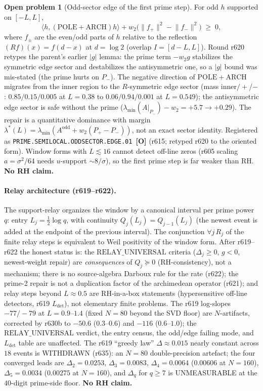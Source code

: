 \documentclass[11pt]{article}
\newcommand{\mO}{\textcolor{openred}{\textbf{[O]}}}
\theoremstyle{definition}
\newtheorem{openproblem}[theorem]{Open problem}
\theoremstyle{remark}
\begin{document}
\begin{openproblem}[Odd-sector edge of the first prime step]
For odd $h$ supported on $[-L,L]$,
\[
  \langle h,(\mathrm{POLE}+\mathrm{ARCH})h\rangle
  + w_2\bigl(\lVert f_+\rVert^2-\lVert f_-\rVert^2\bigr)
  \;\ge\; 0,
\]
where $f_\pm$ are the even/odd parts of $h$ relative to the
reflection $(Rf)(x)=f(d-x)$ at $d=\log 2$ (overlap
$I=[d-L,L]$).  Round r620 retypes the parent's earlier
$\lvert g\rvert$ lemma: the prime term $-w_2 g$ stabilizes the
symmetric edge sector and destabilizes the antisymmetric one,
so a $\lvert g\rvert$ bound was mis-stated (the prime hurts on
$P_-$).  The negative direction of $\mathrm{POLE}+\mathrm{ARCH}$
migrates from the inner region to the $R$-symmetric edge
sector (mass inner$/+$/$-$: $0.85/0.15/0.005$ at $L=0.38$ to
$0.06/0.94/0.001$ at $L=0.549$); the antisymmetric edge
sector is safe without the prime
($\lambda_{\min}(A|_{P_-})-w_2=+5.7\to +0.29$).
The repair is a quantitative dominance with margin
$\lambda^*(L)=\lambda_{\min}(A^{\mathrm{odd}}+w_2(P_+-P_-))$,
not an exact sector identity.
Registered as \texttt{PRIME.SEMILOCAL.ODDSECTOR.EDGE.01}~\mO
(r615; retyped r620 to the oriented form).
Window forms with $L\lesssim 16$ cannot detect off-line zeros
(r605 scaling $a=\sigma^2/64$ needs $u$-support $\sim 8/\sigma$),
so the first prime step is far weaker than RH.
\textbf{No RH claim.}
\end{openproblem}

\paragraph{Relay architecture (r619--r622).}
The support-relay organizes the window by a canonical interval
per prime power $q$: entry $L_j=\tfrac12\log q$, with continuity
$Q_j(L_j)=Q_{j-1}(L_j)$ (the newest event is added at the
endpoint of the previous interval).  The conjunction
$\forall j\,R_j$ of the finite relay steps is equivalent to
Weil positivity of the window form.  After r619--r622 the
honest status is: the $\mathrm{RELAY\_UNIVERSAL}$ criteria
($\Delta_j\ge 0$, $g<0$, newest-weight repair) are
\emph{consequences} of $Q_j\succeq 0$ (RH-consistency), not a
mechanism; there is no source-algebra Darboux rule for the
rate (r622); the prime-2 repair is not a duplication factor of
the archimedean operator (r621); and relay steps beyond
$L\approx 0.5$ are RH-in-a-box statements (hypersensitive
off-line detectors, r619 $L_{\mathrm{det}}$), not elementary
finite problems.  The r619 log-slopes $-77/-79$ at
$L=0.9$--$1.4$ (fixed $N=80$ beyond the SVD floor) are
$N$-artifacts, corrected by r630b to $-50.6$ ($0.3$--$0.6$)
and $-116$ ($0.6$--$1.0$); the $\mathrm{RELAY\_UNIVERSAL}$
verdict, the entry census, the odd/edge failing mode, and
$L_{\mathrm{det}}$ table are unaffected.  The r619
``greedy law'' $\Delta\approx 0.015$ nearly constant across
$18$ events is WITHDRAWN (r635): an $N=80$ double-precision
artefact; the four converged leads are
$\Delta_2=0.0253$, $\Delta_3=0.0083$, $\Delta_4=0.0064$
($0.00606$ at $N=160$), $\Delta_5=0.0034$ ($0.00275$ at
$N=160$), and $\Delta_q$ for $q\ge 7$ is UNMEASURABLE at
the $40$-digit prime-side floor.  \textbf{No RH claim.}
\end{document}
